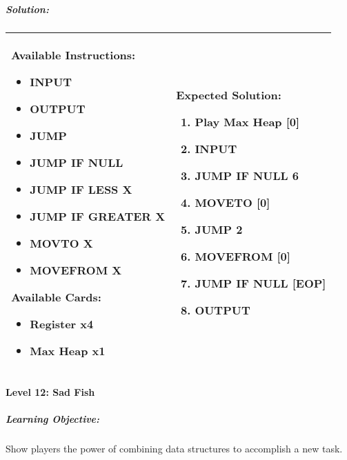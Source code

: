\subparagraph{Solution:} 
\begin{center}
    \begin{tabular}{ | m{5cm} | m{9cm} | } 
        \hline
            \textbf{Available Instructions:} 
            \begin{itemize}
                \setlength\itemsep{-.35em}
                \item INPUT
                \item OUTPUT
                \item JUMP
                \item JUMP IF NULL
                \item JUMP IF LESS X
                \item JUMP IF GREATER X
                \item MOVTO X
                \item MOVEFROM X
            \end{itemize}
            \textbf{Available Cards:} 
            \begin{itemize}
                \setlength\itemsep{-.35em}
                \item Register x4
                \item Max Heap x1
            \end{itemize}& 
            \textbf{Expected Solution:} 
            \begin{enumerate}
                \setlength\itemsep{-.35em}
                \item Play Max Heap [0]
                \item INPUT
                \item JUMP IF NULL 6
                \item MOVETO [0]
                \item JUMP 2
                \item MOVEFROM [0]
                \item JUMP IF NULL [EOP]
                \item OUTPUT
            \end{enumerate}
            \\
        \hline
    \end{tabular}
\end{center}

\paragraph{Level 12: Sad Fish}
\subparagraph{Learning Objective:} Show players the power of combining data structures to accomplish a new task.

